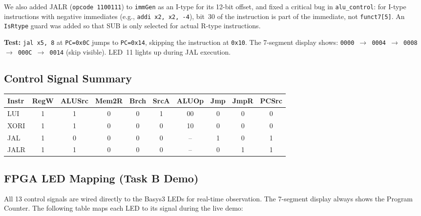 \documentclass[11pt,a4paper]{article}
\begin{document}
We also added JALR (\texttt{opcode 1100111}) to \texttt{immGen} as an I-type for its 12-bit offset, and fixed a critical bug in \texttt{alu\_control}: for I-type instructions with negative immediates (e.g., \texttt{addi x2, x2, -4}), bit~30 of the instruction is part of the immediate, not \texttt{funct7[5]}. An \texttt{IsRtype} guard was added so that SUB is only selected for actual R-type instructions.

\textbf{Test:} \texttt{jal x5, 8} at \texttt{PC=0x0C} jumps to \texttt{PC=0x14}, skipping the instruction at \texttt{0x10}. The 7-segment display shows: \texttt{0000 $\rightarrow$ 0004 $\rightarrow$ 0008 $\rightarrow$ 000C $\rightarrow$ 0014} (skip visible). LED~11 lights up during JAL execution.

\subsection{Control Signal Summary}

\begin{table}[H]
\centering\footnotesize
\begin{tabular}{l|ccccccccc}
\toprule
\textbf{Instr} & \textbf{RegW} & \textbf{ALUSrc} & \textbf{Mem2R} & \textbf{Brch} & \textbf{SrcA} & \textbf{ALUOp} & \textbf{Jmp} & \textbf{JmpR} & \textbf{PCSrc}\\
\midrule
LUI    & 1 & 1 & 0 & 0 & 1 & 00 & 0 & 0 & 0 \\
XORI   & 1 & 1 & 0 & 0 & 0 & 10 & 0 & 0 & 0 \\
JAL    & 1 & 0 & 0 & 0 & 0 & -- & 1 & 0 & 1 \\
JALR   & 1 & 1 & 0 & 0 & 0 & -- & 0 & 1 & 1 \\
\bottomrule
\end{tabular}
\end{table}

\subsection{FPGA LED Mapping (Task B Demo)}

All 13 control signals are wired directly to the Basys3 LEDs for real-time observation. The 7-segment display always shows the Program Counter. The following table maps each LED to its signal during the live demo:
\end{document}

